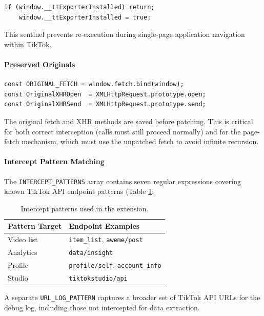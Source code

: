 \begin{verbatim}
if (window.__ttExporterInstalled) return;
    window.__ttExporterInstalled = true;
\end{verbatim}

This sentinel prevents re-execution during single-page application navigation within TikTok.

\paragraph{\textbf{Preserved Originals}}

\begin{verbatim}
const ORIGINAL_FETCH = window.fetch.bind(window);
const OriginalXHROpen  = XMLHttpRequest.prototype.open;
const OriginalXHRSend  = XMLHttpRequest.prototype.send;
\end{verbatim}

The original fetch and XHR methods are saved before patching. This is critical for both correct interception (calls must still proceed normally) and for the page-fetch mechanism, which must use the unpatched fetch to avoid infinite recursion.

\paragraph{\textbf{Intercept Pattern Matching}}

The \texttt{INTERCEPT\_PATTERNS} array contains seven regular expressions covering known TikTok API endpoint patterns (Table \ref{tab:intercept_patterns}:

\begin{table}
    \centering
    \begin{tabular}{ll}
        \toprule
        Pattern Target & Endpoint Examples \\
        \midrule
        Video list & \texttt{item\_list}, \texttt{aweme/post} \\
        Analytics & \texttt{data/insight} \\
        Profile & \texttt{profile/self}, \texttt{account\_info} \\
        Studio & \texttt{tiktokstudio/api} \\
        \bottomrule
    \end{tabular}
    \caption{Intercept patterns used in the extension.}
    \label{tab:intercept_patterns}
\end{table}

A separate \texttt{URL\_LOG\_PATTERN} captures a broader set of TikTok API URLs for the debug log, including those not intercepted for data extraction.

